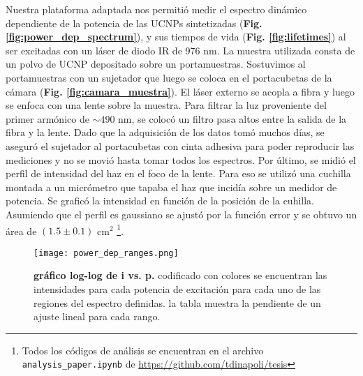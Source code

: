 Nuestra plataforma adaptada nos permitió medir el espectro dinámico dependiente de la potencia de las UCNPs sintetizadas (\textbf{Fig. \ref{fig:power_dep_spectrum}}), y sus tiempos de vida (\textbf{Fig. \ref{fig:lifetimes}}) al ser excitadas con un láser de diodo IR de 976 nm.  
La muestra utilizada consta de un polvo de UCNP depositado sobre un portamuestras.
Sostuvimos al portamuestras con un sujetador que luego se coloca en el portacubetas de la cámara (\textbf{Fig. \ref{fig:camara_muestra}}).
El láser externo se acopla a fibra y luego se enfoca con una lente sobre la muestra.
Para filtrar la luz proveniente del primer armónico de $\sim 490$ nm, se colocó un filtro pasa altos entre la salida de la fibra y la lente.
Dado que la adquisición de los datos tomó muchos días, se aseguró el sujetador al portacubetas con cinta adhesiva para poder reproducir las mediciones y no se movió hasta tomar todos los espectros.
Por último, se midió el perfil de intensidad del haz en el foco de la lente.
Para eso se utilizó una cuchilla montada a un micrómetro que tapaba el haz que incidía sobre un medidor de potencia.
Se graficó la intensidad en función de la posición de la cuhilla.
Asumiendo que el perfil es gaussiano se ajustó por la función error y se obtuvo un área de $(1.5 \pm 0.1)$ cm$^2$ \footnote{Todos los códigos de análisis se encuentran en el archivo \texttt{analysis\_paper.ipynb} de \href{https://github.com/tdinapoli/tesis}{https://github.com/tdinapoli/tesis}}.

\begin{figure}
    \centering
    \texttt{[image: power\_dep\_ranges.png]}
    \caption{\textbf{gráfico log-log de i vs. p.} codificado con colores se encuentran las intensidades para cada potencia de excitación para cada uno de las regiones del espectro definidas. la tabla muestra la pendiente de un ajuste lineal para cada rango.}
    \label{fig:power_dep_ranges}
\end{figure}

